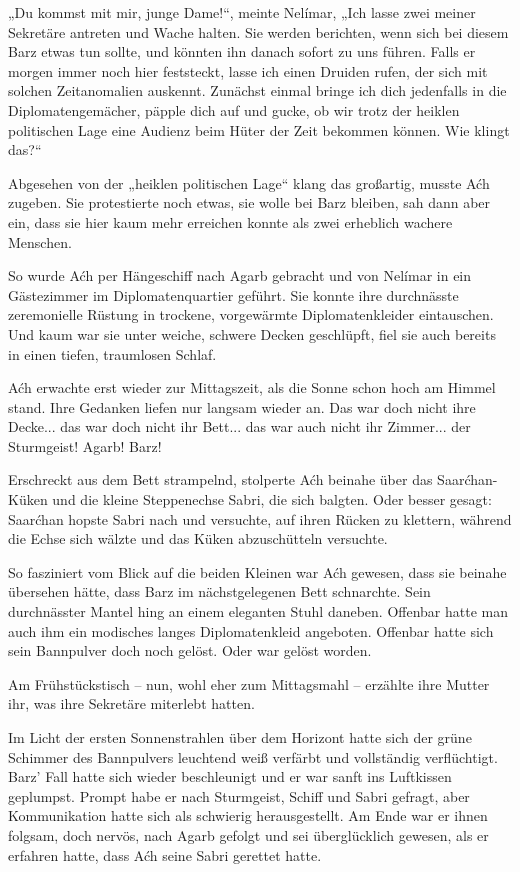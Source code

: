 „Du kommst mit mir, junge Dame!“, meinte Nelímar, „Ich lasse zwei meiner Sekretäre antreten und Wache halten. Sie werden berichten, wenn sich bei diesem Barz etwas tun sollte, und könnten ihn danach sofort zu uns führen. Falls er morgen immer noch hier feststeckt, lasse ich einen Druiden rufen, der sich mit solchen Zeitanomalien auskennt. Zunächst einmal bringe ich dich jedenfalls in die Diplomatengemächer, päpple dich auf und gucke, ob wir trotz der heiklen politischen Lage eine Audienz beim Hüter der Zeit bekommen können. Wie klingt das?“

Abgesehen von der „heiklen politischen Lage“ klang das großartig, musste Aćh zugeben. Sie protestierte noch etwas, sie wolle bei Barz bleiben, sah dann aber ein, dass sie hier kaum mehr erreichen konnte als zwei erheblich wachere Menschen.

So wurde Aćh per Hängeschiff nach Agarb gebracht und von Nelímar in ein Gästezimmer im Diplomatenquartier geführt. Sie konnte ihre durchnässte zeremonielle Rüstung in trockene, vorgewärmte Diplomatenkleider eintauschen. Und kaum war sie unter weiche, schwere Decken geschlüpft, fiel sie auch bereits in einen tiefen, traumlosen Schlaf.



\trennzeichen



Aćh erwachte erst wieder zur Mittagszeit, als die Sonne schon hoch am Himmel stand. Ihre Gedanken liefen nur langsam wieder an. Das war doch nicht ihre Decke... das war doch nicht ihr Bett... das war auch nicht ihr Zimmer... der Sturmgeist! Agarb! Barz!

Erschreckt aus dem Bett strampelnd, stolperte Aćh beinahe über das Saarćhan-Küken und die kleine Steppenechse Sabri, die sich balgten. Oder besser gesagt: Saarćhan hopste Sabri nach und versuchte, auf ihren Rücken zu klettern, während die Echse sich wälzte und das Küken abzuschütteln versuchte.

So fasziniert vom Blick auf die beiden Kleinen war Aćh gewesen, dass sie beinahe übersehen hätte, dass Barz im nächstgelegenen Bett schnarchte. Sein durchnässter Mantel hing an einem eleganten Stuhl daneben. Offenbar hatte man auch ihm ein modisches langes Diplomatenkleid angeboten. Offenbar hatte sich sein Bannpulver doch noch gelöst. Oder war gelöst worden.

Am Frühstückstisch – nun, wohl eher zum Mittagsmahl – erzählte ihre Mutter ihr, was ihre Sekretäre miterlebt hatten.

Im Licht der ersten Sonnenstrahlen über dem Horizont hatte sich der grüne Schimmer des Bannpulvers leuchtend weiß verfärbt und vollständig verflüchtigt. Barz’ Fall hatte sich wieder beschleunigt und er war sanft ins Luftkissen geplumpst. Prompt habe er nach Sturmgeist, Schiff und Sabri gefragt, aber Kommunikation hatte sich als schwierig herausgestellt. Am Ende war er ihnen folgsam, doch nervös, nach Agarb gefolgt und sei überglücklich gewesen, als er erfahren hatte, dass Aćh seine Sabri gerettet hatte.


